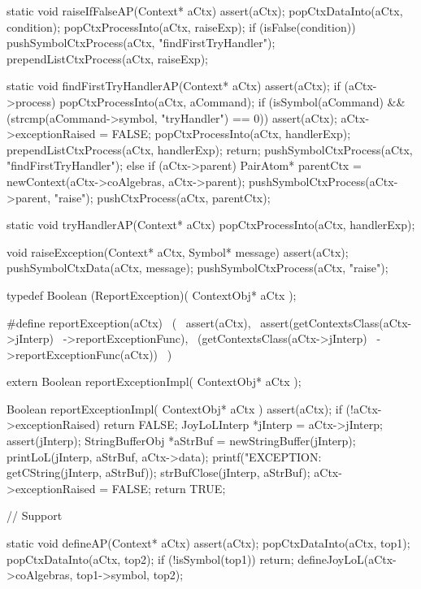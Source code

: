 static void raiseIfFalseAP(Context* aCtx) {
  assert(aCtx);
  popCtxDataInto(aCtx, condition);
  popCtxProcessInto(aCtx, raiseExp);
  if (isFalse(condition)) {
    pushSymbolCtxProcess(aCtx, "findFirstTryHandler");
    prependListCtxProcess(aCtx, raiseExp);
  }
}

static void findFirstTryHandlerAP(Context* aCtx) {
  assert(aCtx);
  if (aCtx->process) {
    popCtxProcessInto(aCtx, aCommand);
    if (isSymbol(aCommand) && (strcmp(aCommand->symbol, "tryHandler") == 0)) {
      assert(aCtx);
      aCtx->exceptionRaised = FALSE;
      popCtxProcessInto(aCtx, handlerExp);
      prependListCtxProcess(aCtx, handlerExp);
      return;
    }
    pushSymbolCtxProcess(aCtx, "findFirstTryHandler");
  } else {
    if (aCtx->parent) {
      PairAtom* parentCtx = newContext(aCtx->coAlgebras, aCtx->parent);
      pushSymbolCtxProcess(aCtx->parent, "raise");
      pushCtxProcess(aCtx, parentCtx);
    }
  }
}

static void tryHandlerAP(Context* aCtx) {
  popCtxProcessInto(aCtx, handlerExp);
}

void raiseException(Context* aCtx, Symbol* message) {
  assert(aCtx);
  pushSymbolCtxData(aCtx, message);
  pushSymbolCtxProcess(aCtx, "raise");
}
\stoptyping

\startCHeader
typedef Boolean (ReportException)(
  ContextObj* aCtx
);

#define reportException(aCtx)               \
  (                                         \
    assert(aCtx),                           \
    assert(getContextsClass(aCtx->jInterp)  \
      ->reportExceptionFunc),               \
    (getContextsClass(aCtx->jInterp)        \
      ->reportExceptionFunc(aCtx))          \
  )
\stopCHeader

\setCHeaderStream{private}
\startCHeader
extern Boolean reportExceptionImpl(
  ContextObj* aCtx
);
\stopCHeader
{}

\startCCode
Boolean reportExceptionImpl(
  ContextObj* aCtx
) {
  assert(aCtx);
  if (!aCtx->exceptionRaised) return FALSE;
  JoyLoLInterp *jInterp = aCtx->jInterp;
  assert(jInterp);
  StringBufferObj *aStrBuf = 
    newStringBuffer(jInterp);
  printLoL(jInterp, aStrBuf, aCtx->data);
  printf("\nUNHANDLED EXCEPTION: %
    getCString(jInterp, aStrBuf));
  strBufClose(jInterp, aStrBuf);
  aCtx->exceptionRaised = FALSE;
  return TRUE;
}
\stopCCode

\starttyping
// Support

static void defineAP(Context* aCtx) {
  assert(aCtx);
  popCtxDataInto(aCtx, top1);
  popCtxDataInto(aCtx, top2);
  if (!isSymbol(top1)) return;
  defineJoyLoL(aCtx->coAlgebras, top1->symbol, top2);
}

